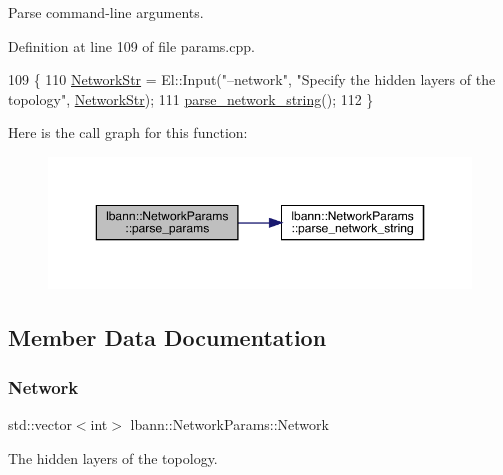 Parse command-\/line arguments. 



Definition at line 109 of file params.\+cpp.


\begin{DoxyCode}
109                                       \{
110   \hyperlink{classlbann_1_1NetworkParams_a8b503690c7475582b5a843f0959c3f2a}{NetworkStr} = El::Input(\textcolor{stringliteral}{"--network"}, \textcolor{stringliteral}{"Specify the hidden layers of the topology"}, 
      \hyperlink{classlbann_1_1NetworkParams_a8b503690c7475582b5a843f0959c3f2a}{NetworkStr});
111   \hyperlink{classlbann_1_1NetworkParams_a14954fcbacb6c9522bd3cf6c28bc93d5}{parse\_network\_string}();
112 \}
\end{DoxyCode}
Here is the call graph for this function\+:\nopagebreak
\begin{figure}[H]
\begin{center}
\leavevmode
\includegraphics[width=350pt]{classlbann_1_1NetworkParams_a9b6f7e0330547330238085f3fd0e3702_cgraph}
\end{center}
\end{figure}


\subsection{Member Data Documentation}
\mbox{\label{classlbann_1_1NetworkParams_a17ccde99dec30d27c836a23f003fa34d}} 
\subsubsection{\texorpdfstring{Network}{Network}}
{\footnotesize\ttfamily std\+::vector$<$int$>$ lbann\+::\+Network\+Params\+::\+Network}



The hidden layers of the topology. 



